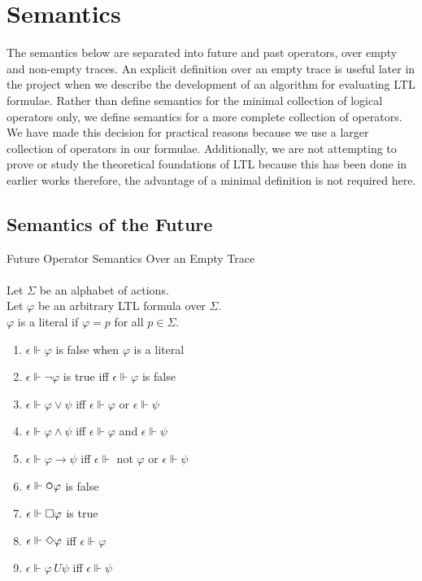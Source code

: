 \section{Semantics}

The semantics below are separated into future and past operators, over empty and non-empty traces.  An explicit definition over an empty trace is useful later in the project when we describe the development of an algorithm for evaluating LTL formulae.  Rather than define semantics for the minimal collection of logical operators only, we define semantics for a more complete collection of operators.  We have made this decision for practical reasons because we use a larger collection of operators in our formulae.  Additionally, we are not attempting to prove or study the theoretical foundations of LTL because this has been done in earlier works \cite{Pnueli} therefore, the advantage of a minimal definition is not required here.

\newpage

\subsection{Semantics of the Future}
\label{sec:LTLFutureSemantics}

\begin{definition}Future Operator Semantics Over an Empty Trace\\
\label{def:FutureEmptyTraceSemantics}
\\
Let $\Sigma$ be an alphabet of actions.\\
Let $\varphi$ be an arbitrary LTL formula over $\Sigma$.\\
$\varphi$ is a literal if $\varphi = p$ for all $p \in \Sigma$.

\begin{enumerate}[start=1]
\item $ \epsilon \Vdash \varphi $ is false when $ \varphi $ is a literal
\item $ \epsilon \Vdash \neg\varphi $ is true iff $ \epsilon \Vdash \varphi $ is false
\item $ \epsilon \Vdash \varphi \lor \psi $ iff $ \epsilon \Vdash \varphi $ or $ \epsilon \Vdash \psi $
\item $ \epsilon \Vdash \varphi \land \psi $ iff $ \epsilon \Vdash \varphi $ and $ \epsilon \Vdash \psi $
\item $ \epsilon \Vdash \varphi \rightarrow \psi $ iff $ \epsilon \Vdash $ not $ \varphi $ or $ \epsilon \Vdash \psi $
\item $ \epsilon \Vdash \LTLnext\varphi $ is false
\item $ \epsilon \Vdash \square\varphi $ is true
\item $ \epsilon \Vdash \Diamond\varphi $ iff $ \epsilon \Vdash \varphi $
\item $ \epsilon \Vdash \varphi \,U \psi $ iff $ \epsilon \Vdash \psi $
\end{enumerate}
\end{definition}

